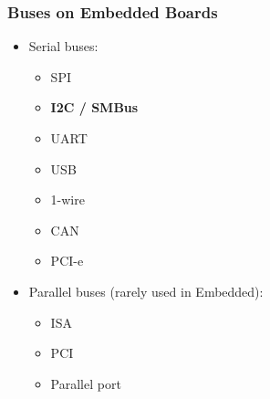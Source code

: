 \begin{frame}
  \frametitle{Buses on Embedded Boards}
  \begin{itemize}
    \item Serial buses:
      \begin{itemize}
        \item SPI
        \item \textbf{I2C / SMBus}
        \item UART
        \item USB
        \item 1-wire
        \item CAN
        \item PCI-e
      \end{itemize}
    \item Parallel buses (rarely used in Embedded):
      \begin{itemize}
        \item ISA
        \item PCI
        \item Parallel port
      \end{itemize}
  \end{itemize}
\end{frame}

